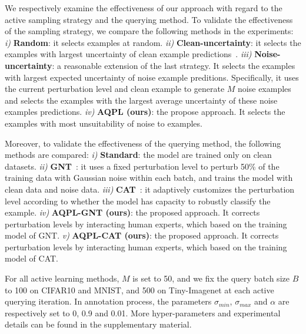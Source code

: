 \documentclass[letterpaper]{article} %
\begin{document}
We respectively examine the effectiveness of our approach with regard to the active sampling strategy and the querying method. To validate the effectiveness of the sampling strategy, we compare the following methods in the experiments:
\emph{i)} \textbf{Random}: it selects examples at random.
\emph{ii)} \textbf{Clean-uncertainty}: it selects the examples with largest uncertainty of clean example predictions~\cite{lewis1994sequential}.
\emph{iii)} \textbf{Noise-uncertainty}: a reasonable extension of the last strategy. It selects the examples with largest expected uncertainty of noise example preditions. Specifically, it uses the current perturbation level and clean example to generate $M$ noise examples and selects the examples with the largest average uncertainty of these noise examples predictions.
\emph{iv)} \textbf{AQPL (ours)}: the propose approach. It selects the examples with most unsuitability of noise to examples.

Moreover, to validate the effectiveness of the querying method, the following methods are compared:
\emph{i)} \textbf{Standard}: the model are trained only on clean datasets.
\emph{ii)} \textbf{GNT}~\cite{rusak2020increasing}: it uses a fixed perturbation level to perturb 50\% of the training data with  Gaussian noise within each batch, and trains the model with clean data and noise data.
\emph{iii)} \textbf{CAT}~\cite{cheng2020cat}: it adaptively customizes the perturbation level according to whether the model has capacity to robustly classify the example.
\emph{iv)} \textbf{AQPL-GNT (ours)}: the proposed approach. It corrects perturbation levels by interacting human experts, which based on the training model of GNT.
\emph{v)} \textbf{AQPL-CAT (ours)}: the proposed approach. It corrects perturbation levels by interacting human experts, which based on the training model of CAT.

For all active learning methods, $M$ is set to 50, and we fix the query batch size $B$ to 100 on CIFAR10 and MNIST, and 500 on Tiny-Imagenet at each active querying iteration. In annotation process, the parameters $\sigma_{min}$, $\sigma_{max}$ and $\alpha$ are respectively set to 0, 0.9 and 0.01. More hyper-parameters and experimental details can be found in the supplementary material.
\end{document}
